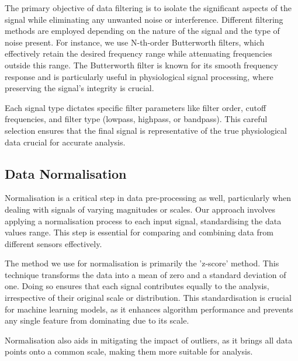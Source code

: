 The primary objective of data filtering is to isolate the significant aspects of the signal while eliminating any unwanted noise or interference. Different filtering methods are employed depending on the nature of the signal and the type of noise present. For instance, we use N-th-order Butterworth filters, which effectively retain the desired frequency range while attenuating frequencies outside this range. The Butterworth filter is known for its smooth frequency response and is particularly useful in physiological signal processing, where preserving the signal's integrity is crucial.

Each signal type dictates specific filter parameters like filter order, cutoff frequencies, and filter type (lowpass, highpass, or bandpass). This careful selection ensures that the final signal is representative of the true physiological data crucial for accurate analysis.

\subsection*{Data Normalisation }
Normalisation is a critical step in data pre-processing as well, particularly when dealing with signals of varying magnitudes or scales. Our approach involves applying a normalisation process to each input signal, standardising the data values range. This step is essential for comparing and combining data from different sensors effectively.

The method we use for normalisation is primarily the 'z-score' method. This technique transforms the data into a mean of zero and a standard deviation of one. Doing so ensures that each signal contributes equally to the analysis, irrespective of their original scale or distribution. This standardisation is crucial for machine learning models, as it enhances algorithm performance and prevents any single feature from dominating due to its scale.

Normalisation also aids in mitigating the impact of outliers, as it brings all data points onto a common scale, making them more suitable for analysis.

